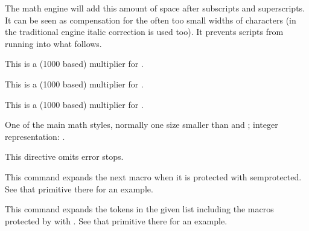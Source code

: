 \stopoldprimitive

\startoldprimitive[title={\prm {scriptspace}}][obsolete=yes]

The math engine will add this amount of space after subscripts and superscripts.
It can be seen as compensation for the often too small widths of characters (in
the traditional engine italic correction is used too). It prevents scripts from
running into what follows.

\stopoldprimitive

\startnewprimitive[title={\prm {scriptspaceafterfactor}}]

This is a (1000 based) multiplier for .

\stopnewprimitive

\startnewprimitive[title={\prm {scriptspacebeforefactor}}]

This is a (1000 based) multiplier for .

\stopnewprimitive

\startnewprimitive[title={\prm {scriptspacebetweenfactor}}]

This is a (1000 based) multiplier for .

\stopnewprimitive

\startoldprimitive[title={\prm {scriptstyle}}]

One of the main math styles, normally one size smaller than 
and ; integer representation: \the\scriptstyle.

\stopoldprimitive

\startoldprimitive[title={\prm {scrollmode}}]

    This directive omits error stops.

\stopoldprimitive

\startnewprimitive[title={\prm {semiexpand}}]

This command expands the next macro when it is protected with \prm
{semprotected}. See that primitive there for an example.

\stopnewprimitive

\startnewprimitive[title={\prm {semiexpanded}}]

This command expands the tokens in the given list including the macros protected
by with . See that primitive there for an example.

\stopnewprimitive

\startnewprimitive[title={\prm {semiprotected}}]

